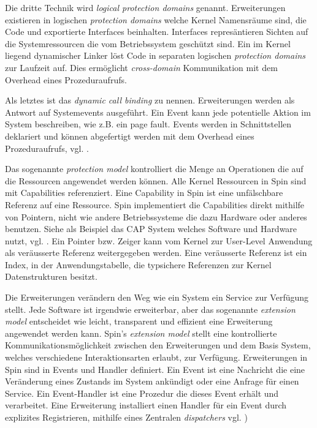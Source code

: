 \documentclass[11pt,technote]{IEEEtran}
\begin{document}
      Die dritte Technik wird \textit{logical protection domains} genannt. Erweiterungen existieren in logischen \textit{protection domains} welche Kernel
      Namensr\"aume sind, die Code und exportierte Interfaces beinhalten. Interfaces repres\"antieren Sichten auf die Systemressourcen
      die vom Betriebssystem gesch\"utzt sind. Ein im Kernel liegend dynamischer Linker l\"ost Code in separaten logischen 
      \textit{protection domains} zur Laufzeit auf. Dies erm\"oglicht \textit{cross-domain} Kommunikation mit dem Overhead eines Prozeduraufrufs.
      
      Als letztes ist das \textit{dynamic call binding} zu nennen. Erweiterungen werden als Antwort auf Systemevents ausgef\"uhrt.
      Ein Event kann jede potentielle Aktion im System beschreiben, wie z.B. ein page fault. Events werden in Schnittstellen deklariert
      und k\"onnen abgefertigt werden mit dem Overhead eines Prozeduraufrufs, vgl. \cite[S. 267 f]{inproc:spin}.
      
      Das sogenannte \textit{protection model} kontrolliert die Menge an Operationen die auf die Ressourcen angewendet werden k\"onnen.
      Alle Kernel Ressourcen in Spin sind mit Capabilities referenziert. 
      Eine Capability in Spin ist eine unf\"alschbare Referenz auf eine Ressource.
      Spin implementiert die Capabilities direkt mithilfe von Pointern, nicht wie andere Betriebssysteme die dazu Hardware oder anderes benutzen.
      Siehe als Beispiel das CAP System welches Software und Hardware nutzt, vgl. \cite{inproc:cap}.
      Ein Pointer bzw. Zeiger kann vom Kernel zur User-Level Anwendung als ver\"ausserte Referenz weitergegeben werden.
      Eine ver\"ausserte Referenz ist ein Index, in der Anwendungstabelle, die typsichere Referenzen zur Kernel Datenstrukturen besitzt.
      
      Die Erweiterungen ver\"andern den Weg wie ein System ein Service zur Verf\"ugung stellt. Jede Software ist irgendwie erweiterbar, 
      aber das sogenannte \textit{extension model} entscheidet wie leicht, transparent und effizient eine Erweiterung angewendet werden kann. 
      Spin's \textit{extension model} stellt eine kontrollierte Kommunikationsm\"oglichkeit zwischen den Erweiterungen und dem Basis System,
      welches verschiedene Interaktionsarten erlaubt, zur Verf\"ugung.
      Erweiterungen in Spin sind in Events und Handler definiert. Ein Event ist eine Nachricht die eine Ver\"anderung eines Zustands im System ank\"undigt
      oder eine Anfrage f\"ur einen Service. Ein Event-Handler ist eine Prozedur die dieses Event erh\"alt und verarbeitet. 
      Eine Erweiterung installiert einen Handler f\"ur ein Event durch explizites Registrieren, mithilfe eines Zentralen
      \textit{dispatchers} vgl. \cite[S. 272]{inproc:spin})
      
\end{document}
